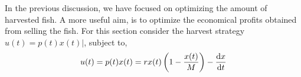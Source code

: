 In the previous discussion, we have focused on optimizing the amount of harvested fish. A more useful aim, is to optimize the economical profits obtained from selling the fish. For this section consider the harvest strategy $u(t)=p(t)x(t)|$, subject to,
\begin{equation}
  u(t)=p(t)x(t)=rx(t)\left(1-\frac{x(t)}{M}\right)-\frac{\mathrm{d} x}{{\mathrm{d} t}}
\end{equation}